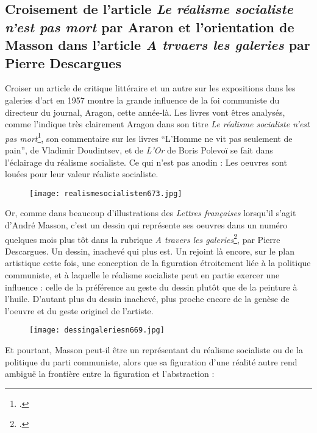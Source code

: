 \subsection{Croisement de l'article \emph{Le réalisme socialiste n'est pas mort} par Araron et l'orientation de Masson dans l'article \emph{A trvaers les galeries} par Pierre Descargues}

	Croiser un article de critique littéraire et un autre sur les expositions dans les galeries d’art en 1957 montre la grande influence de la foi communiste du directeur du journal, Aragon, cette année-là. Les livres vont êtres analysés, comme l’indique très clairement Aragon dans son titre \emph{Le réalisme socialiste n’est pas mort}\footcite{realsoc}, son commentaire sur les livres \enquote{L’Homme ne vit pas seulement de pain}, de Vladimir Doudintsev, et de \emph{L’Or} de Boris Polevoï se fait dans l’éclairage du réalisme socialiste. Ce qui n’est pas anodin : Les oeuvres sont louées pour leur valeur réaliste socialiste. 

\begin{figure}[H]
   \centering
   \texttt{[image: realismesocialisten673.jpg]}
	\caption{\cite{realsoc}}\label{fig:Réalistesocialistepasmort}
\end{figure}

	

	Or, comme dans beaucoup d’illustrations des \emph{Lettres françaises }lorsqu’il s’agit d’André Masson, c’est un dessin qui représente ses oeuvres dans un numéro quelques mois plus tôt dans la rubrique \emph{A travers les galeries}\footcite{atraversgaleries}, par Pierre Descargues. Un dessin, inachevé qui plus est. Un rejoint là encore, sur le plan artistique cette fois, une conception de la figuration étroitement liée à la politique communiste, et à laquelle le réalisme socialiste peut en partie exercer une influence : celle de la préférence au geste du dessin plutôt que de la peinture à l’huile. D’autant plus du dessin inachevé, plus proche encore de la genèse de l’oeuvre et du geste originel de l’artiste. 

\begin{figure}[H]
   \centering
   \texttt{[image: dessingaleriesn669.jpg]}
	\caption{\cite{realsoc}}\label{fig:Atraverslesgaleries}
\end{figure}



	Et pourtant, Masson peut-il être un représentant du réalisme socialiste ou de la politique du parti communiste, alors que sa figuration d’une réalité autre rend ambiguë la frontière entre la figuration et l’abstraction : 
	
